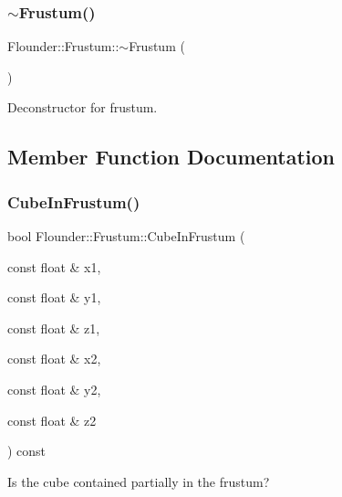 \mbox{\label{class_flounder_1_1_frustum_a5728c1505123142f1fa0da155e3aed0a}} 
\subsubsection{\texorpdfstring{$\sim$\+Frustum()}{~Frustum()}}
{\footnotesize\ttfamily Flounder\+::\+Frustum\+::$\sim$\+Frustum (\begin{DoxyParamCaption}{ }\end{DoxyParamCaption})}



Deconstructor for frustum. 



\subsection{Member Function Documentation}
\mbox{\label{class_flounder_1_1_frustum_a30313578e371b447760b976b8e18a7e3}} 
\subsubsection{\texorpdfstring{Cube\+In\+Frustum()}{CubeInFrustum()}}
{\footnotesize\ttfamily bool Flounder\+::\+Frustum\+::\+Cube\+In\+Frustum (\begin{DoxyParamCaption}\item[{const float \&}]{x1,  }\item[{const float \&}]{y1,  }\item[{const float \&}]{z1,  }\item[{const float \&}]{x2,  }\item[{const float \&}]{y2,  }\item[{const float \&}]{z2 }\end{DoxyParamCaption}) const}



Is the cube contained partially in the frustum? 


